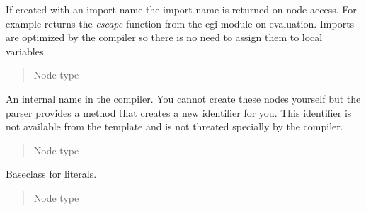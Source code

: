 \documentclass[a4paper,10pt,english]{sphinxmanual}
\begin{document}

\begin{fulllineitems}
\label{extensions:jinja2.nodes.ImportedName}
If created with an import name the import name is returned on node
access.  For example  returns the \emph{escape}
function from the cgi module on evaluation.  Imports are optimized by the
compiler so there is no need to assign them to local variables.
\begin{quote}\begin{description}
\item[{Node type}] \leavevmode
{\hyperref[extensions:jinja2.nodes.Expr]{}}

\end{description}\end{quote}

\end{fulllineitems}


\begin{fulllineitems}
\label{extensions:jinja2.nodes.InternalName}
An internal name in the compiler.  You cannot create these nodes
yourself but the parser provides a
{\hyperref[extensions:jinja2.parser.Parser.free_identifier]{}} method that creates
a new identifier for you.  This identifier is not available from the
template and is not threated specially by the compiler.
\begin{quote}\begin{description}
\item[{Node type}] \leavevmode
{\hyperref[extensions:jinja2.nodes.Expr]{}}

\end{description}\end{quote}

\end{fulllineitems}


\begin{fulllineitems}
\label{extensions:jinja2.nodes.Literal}
Baseclass for literals.
\begin{quote}\begin{description}
\item[{Node type}] \leavevmode
{\hyperref[extensions:jinja2.nodes.Expr]{}}

\end{description}\end{quote}

\end{fulllineitems}
\end{document}
